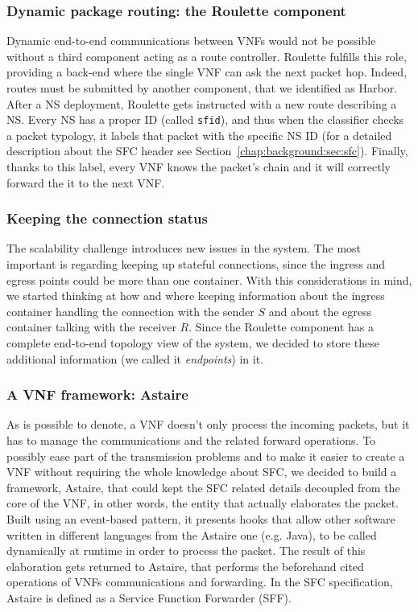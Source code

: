 \subsubsection{Dynamic package routing: the Roulette component}
\label{chap:prjan:sec:tech:sub:SFC:sub:roulette}
Dynamic end-to-end communications between VNFs would not be possible without a
third component acting as a route controller. Roulette fulfills this role,
providing a back-end where the single VNF can ask the next packet hop. Indeed,
routes must be submitted by another component, that we identified as Harbor.
After a NS deployment, Roulette gets instructed with a new route describing a
NS. Every NS has a proper ID (called \verb!sfid!), and thus when the classifier
checks a packet typology, it labels that packet with the specific NS ID (for a
detailed description about the SFC header see
Section~\ref{chap:background:sec:sfc}). Finally, thanks to this label, every VNF
knows the packet's chain and it will correctly forward the it to the next VNF.

\subsubsection{Keeping the connection status}
The scalability challenge introduces new issues in the system. The most
important is regarding keeping up stateful connections, since the ingress and
egress points could be more than one container. With this considerations in
mind, we started thinking at how and where keeping information about the ingress
container handling the connection with the sender $S$ and about the egress
container talking with the receiver $R$. Since the Roulette component has a
complete end-to-end topology view of the system, we decided to store these
additional information (we called it \emph{endpoints}) in it.

\subsubsection{A VNF framework: Astaire}
As is possible to denote, a VNF doesn't only process the incoming packets, but
it has to manage the communications and the related forward operations. To
possibly ease part of the transmission problems and to make it easier to create
a VNF without requiring the whole knowledge about SFC, we decided to build a
framework, Astaire, that could kept the SFC related details decoupled from the
core of the VNF, in other words, the entity that actually elaborates the packet.
Built using an event-based pattern, it presents hooks that allow other software
written in different languages from the Astaire one (e.g. Java), to be called
dynamically at runtime in order to process the packet. The result of this
elaboration gets returned to Astaire, that performs the beforehand cited
operations of VNFs communications and forwarding. In the SFC specification,
Astaire is defined as a Service Function Forwarder (SFF).

